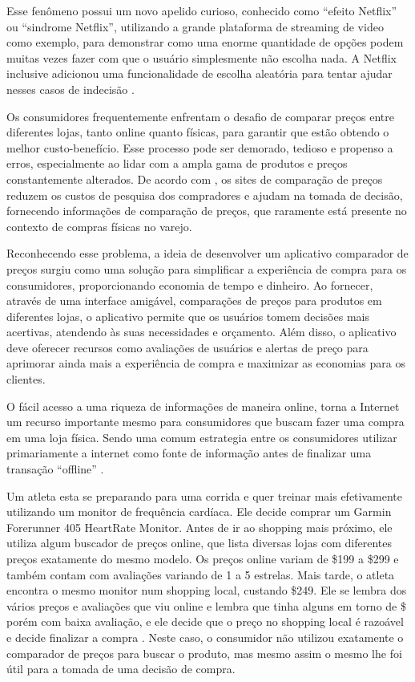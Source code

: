 Esse fenômeno possui um novo apelido curioso, conhecido como ``efeito Netflix'' ou ``sindrome Netflix'', utilizando a grande plataforma de streaming de video como exemplo, para demonstrar como uma enorme quantidade de opções podem muitas vezes fazer com que o usuário simplesmente não escolha nada. A Netflix inclusive adicionou uma funcionalidade de escolha aleatória para tentar ajudar nesses casos de indecisão \cite{estadao_paradoxo_escolha}.

Os consumidores frequentemente enfrentam o desafio de comparar preços entre diferentes lojas, tanto online quanto físicas, para garantir que estão obtendo o melhor custo-benefício. Esse processo pode ser demorado, tedioso e propenso a erros, especialmente ao lidar com a ampla gama de produtos e preços constantemente alterados. De acordo com \textcite{jung2014online}, os sites de comparação de preços reduzem os custos de pesquisa dos compradores e ajudam na tomada de decisão, fornecendo informações de comparação de preços,
que raramente está presente no contexto de compras físicas no varejo.


Reconhecendo esse problema, a ideia de desenvolver um aplicativo comparador de preços surgiu como uma solução para simplificar a experiência de compra para os consumidores, proporcionando economia de tempo e dinheiro. Ao fornecer, através de uma interface amigável, comparações de preços para produtos em diferentes lojas, o aplicativo permite que os usuários tomem decisões mais acertivas, atendendo às suas necessidades e orçamento. Além disso, o aplicativo deve oferecer recursos como avaliações de usuários e alertas de preço para aprimorar ainda mais a experiência de compra e maximizar as economias para os clientes.


O fácil acesso a uma riqueza de informações de maneira online, torna a Internet um recurso importante mesmo para consumidores que buscam fazer uma compra em uma loja física. Sendo uma comum estrategia entre os consumidores utilizar primariamente a internet como fonte de informação antes de finalizar uma transação ``offline'' \cite{pauwels2011does}. 

Um atleta esta se preparando para uma corrida e quer treinar mais efetivamente utilizando um monitor de frequência cardíaca. Ele decide comprar um Garmin Forerunner 405 HeartRate Monitor. Antes de ir ao shopping mais próximo, ele utiliza algum buscador de preços online, que lista diversas lojas com diferentes preços exatamente do mesmo modelo. Os preços online variam de \$199 a \$299 e também contam com avaliações variando de 1 a 5 estrelas. Mais tarde, o atleta encontra o mesmo monitor num shopping local, custando \$249. Ele se lembra dos vários preços e avaliações que viu online e lembra que tinha alguns em torno de \$ porém com baixa avaliação, e ele decide que o preço no shopping local é razoável e decide finalizar a compra \textcite{bodur2015online}. Neste caso, o consumidor não utilizou exatamente o comparador de preços para buscar o produto, mas mesmo assim o mesmo lhe foi útil para a tomada de uma decisão de compra.

